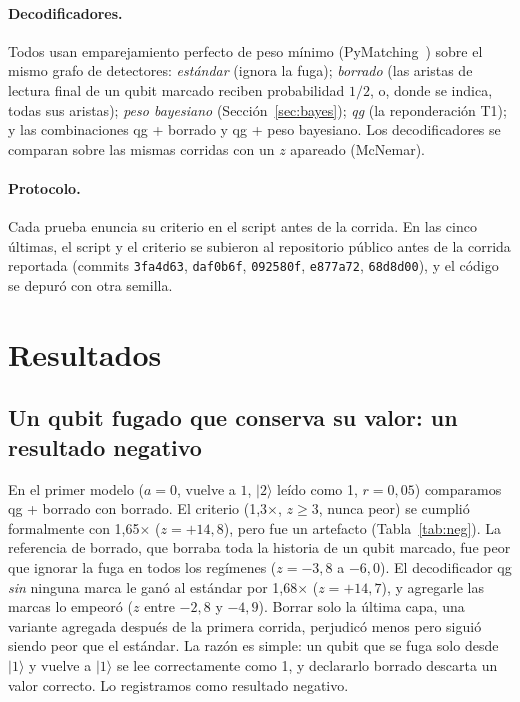 \documentclass[11pt]{article}
\begin{document}
\paragraph{Decodificadores.} Todos usan emparejamiento perfecto de peso mínimo
(PyMatching~\cite{higgott2022pymatching}) sobre el mismo grafo de detectores: \emph{estándar} (ignora
la fuga); \emph{borrado} (las aristas de lectura final de un qubit marcado reciben probabilidad $1/2$,
o, donde se indica, todas sus aristas); \emph{peso bayesiano} (Sección~\ref{sec:bayes}); \emph{qg} (la
reponderación T1); y las combinaciones qg + borrado y qg + peso bayesiano. Los decodificadores se
comparan sobre las mismas corridas con un $z$ apareado (McNemar).

\paragraph{Protocolo.} Cada prueba enuncia su criterio en el script antes de la corrida. En las cinco
últimas, el script y el criterio se subieron al repositorio público antes de la corrida reportada
(commits \texttt{3fa4d63}, \texttt{daf0b6f}, \texttt{092580f}, \texttt{e877a72},
\texttt{68d8d00}), y el código se depuró con otra semilla.

\section{Resultados}

\subsection{Un qubit fugado que conserva su valor: un resultado negativo}

En el primer modelo ($a=0$, vuelve a $1$, $|2\rangle$ leído como 1, $r=0{,}05$) comparamos qg + borrado
con borrado. El criterio (1{,}3$\times$, $z\ge3$, nunca peor) se cumplió formalmente con 1{,}65$\times$
($z=+14{,}8$), pero fue un artefacto (Tabla~\ref{tab:neg}). La referencia de borrado, que borraba toda
la historia de un qubit marcado, fue peor que ignorar la fuga en todos los regímenes ($z=-3{,}8$ a
$-6{,}0$). El decodificador qg \emph{sin} ninguna marca le ganó al estándar por 1{,}68$\times$
($z=+14{,}7$), y agregarle las marcas lo empeoró ($z$ entre $-2{,}8$ y $-4{,}9$). Borrar solo la última
capa, una variante agregada después de la primera corrida, perjudicó menos pero siguió siendo peor que
el estándar. La razón es simple: un qubit que se fuga solo desde $|1\rangle$ y vuelve a $|1\rangle$ se
lee correctamente como 1, y declararlo borrado descarta un valor correcto. Lo registramos como
resultado negativo.
\end{document}
